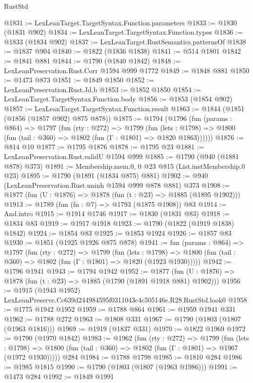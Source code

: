 \begin{lexlean}{RustStd}
\begin{coremodule}
@1831 := LexLeanTarget.TargetSyntax.Function.parameters
@1833 := @1830 (@1831 @902)
@1834 := LexLeanTarget.TargetSyntax.Function.types
@1836 := @1833 (@1834 @902)
@1837 := LexLeanTarget.RustSemantics.patternsOf
@1838 := @1837 @904
@1840 := @1822 (@1836 @1838)
@1841 := @514 @1801
@1842 := @1841 @881
@1844 := @1790 (@1840 @1842)
@1848 := LexLeanPreservation.Rust.Corr @1594 @999 @1772
@1849 := @1848 @881
@1850 := @1473 @873
@1851 := @1849 @1850
@1852 := LexLeanPreservation.Rust.Jd.b
@1853 := @1852 @1850
@1854 := LexLeanTarget.TargetSyntax.Function.body
@1856 := @1853 (@1854 @902)
@1857 := LexLeanTarget.TargetSyntax.Function.result
@1863 := @1844 (@1851 (@1856 (@1857 @902) @875 @878))
@1875 := @1794
    (@1796
      (fun (params : @864) =>
      @1797
        (fun (rty : @272) =>
        @1799
          (fun (lets : @1798) =>
          @1800 (fun (tail : @360) => @1802 (fun (Γ : @1801) => @1820 @1863))))))
@1876 := @814 @10
@1877 := @1795 @1876
@1878 := @1795 @23
@1881 := LexLeanPreservation.Rust.validU @1594 @999
@1885 := @1790 (@940 (@1881 @878) @373)
@1891 := Membership.mem.{0, 0} @23 @815 (List.instMembership.{0} @23)
@1895 := @1790 (@1891 (@1834 @875) @881)
@1902 := @940 (LexLeanPreservation.Rust.uninh @1594 @999 @878 @881) @373
@1908 := @1877 (fun (U : @1876) => @1878 (fun (t : @23) => @1885 (@1895 @1902)))
@1913 := @1789 (fun (fn : @7) => @1793 (@1875 @1908)) @83
@1914 := And.intro
@1915 := @1914 @1746
@1917 := @1830 (@1831 @83)
@1918 := @1834 @83
@1919 := @1917 @1918
@1923 := @1790 (@1822 (@1919 @1838) @1842)
@1924 := @1854 @83
@1925 := @1853 @1924
@1926 := @1857 @83
@1930 := @1851 (@1925 @1926 @875 @878)
@1941 := fun (params : @864) =>
  @1797
    (fun (rty : @272) =>
    @1799
      (fun (lets : @1798) =>
      @1800 (fun (tail : @360) => @1802 (fun (Γ : @1801) => @1820 (@1923 @1930)))))
@1942 := @1796 @1941
@1943 := @1794 @1942
@1952 := @1877 (fun (U : @1876) => @1878 (fun (t : @23) => @1885 (@1790 (@1891 @1918 @881) @1902)))
@1956 := @1915 (@1943 @1952) LexLeanPreserve.Cc639d244984595f0311043c4c505146e.R28.RustStd.look0
@1958 := @1775 @1942 @1952
@1959 := @1788 @864
@1961 := @1959 @1941 @331
@1962 := @1788 @272
@1963 := @1808 @331
@1967 := @1790 (@1803 (@1807 (@1963 @1816)))
@1969 := @1919 (@1837 @331)
@1970 := @1822 @1969
@1972 := @1790 (@1970 @1842)
@1983 := @1962
    (fun (rty : @272) =>
    @1799
      (fun (lets : @1798) =>
      @1800 (fun (tail : @360) => @1802 (fun (Γ : @1801) => @1967 (@1972 @1930)))))
    @284
@1984 := @1788 @1798
@1985 := @1810 @284
@1986 := @1985 @1815
@1990 := @1790 (@1803 (@1807 (@1963 @1986)))
@1991 := @1473 @284
@1992 := @1849 @1991

\end{coremodule}
\end{lexlean}
